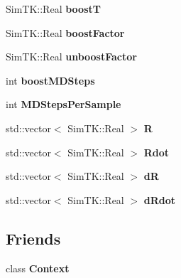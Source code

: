 \begin{DoxyCompactItemize}
\item 
Sim\+T\+K\+::\+Real {\bfseries boostT}\hypertarget{classHMCSampler_a709f4760098c1ce280793e0eb0ef0dca}{}\label{classHMCSampler_a709f4760098c1ce280793e0eb0ef0dca}

\item 
Sim\+T\+K\+::\+Real {\bfseries boost\+Factor}\hypertarget{classHMCSampler_af0ccf6cd8e96cbaf55ccdebbb55e4419}{}\label{classHMCSampler_af0ccf6cd8e96cbaf55ccdebbb55e4419}

\item 
Sim\+T\+K\+::\+Real {\bfseries unboost\+Factor}\hypertarget{classHMCSampler_a799ed5a2c3e212576f0f11ba89a86343}{}\label{classHMCSampler_a799ed5a2c3e212576f0f11ba89a86343}

\item 
int {\bfseries boost\+M\+D\+Steps}\hypertarget{classHMCSampler_a6b9ff11f9edc77345ba2c7bdfd5887a8}{}\label{classHMCSampler_a6b9ff11f9edc77345ba2c7bdfd5887a8}

\item 
int {\bfseries M\+D\+Steps\+Per\+Sample}\hypertarget{classHMCSampler_addee9ed20989678559ed764c114fe04c}{}\label{classHMCSampler_addee9ed20989678559ed764c114fe04c}

\item 
std\+::vector$<$ Sim\+T\+K\+::\+Real $>$ {\bfseries R}\hypertarget{classHMCSampler_a960f036573f204c55f105af554777e8f}{}\label{classHMCSampler_a960f036573f204c55f105af554777e8f}

\item 
std\+::vector$<$ Sim\+T\+K\+::\+Real $>$ {\bfseries Rdot}\hypertarget{classHMCSampler_a5f4d839058ef10a0e6c4ecf998f5d05f}{}\label{classHMCSampler_a5f4d839058ef10a0e6c4ecf998f5d05f}

\item 
std\+::vector$<$ Sim\+T\+K\+::\+Real $>$ {\bfseries dR}\hypertarget{classHMCSampler_a95e917dbcb8595d292add5e618ac5559}{}\label{classHMCSampler_a95e917dbcb8595d292add5e618ac5559}

\item 
std\+::vector$<$ Sim\+T\+K\+::\+Real $>$ {\bfseries d\+Rdot}\hypertarget{classHMCSampler_a0f5b2c1ecfc84755be4da47d89ebbb68}{}\label{classHMCSampler_a0f5b2c1ecfc84755be4da47d89ebbb68}

\end{DoxyCompactItemize}
\subsection*{Friends}
\begin{DoxyCompactItemize}
\item 
class {\bfseries Context}\hypertarget{classHMCSampler_ac26c806e60ca4a0547680edb68f6e39b}{}\label{classHMCSampler_ac26c806e60ca4a0547680edb68f6e39b}

\end{DoxyCompactItemize}
